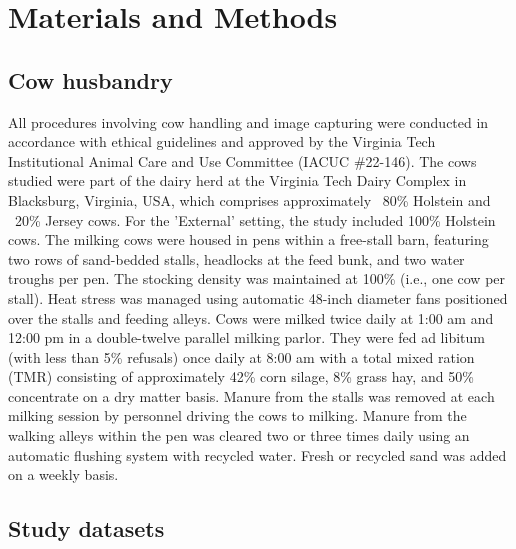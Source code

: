 \section{Materials and Methods}

\subsection*{Cow husbandry}

All procedures involving cow handling and image capturing were conducted in accordance with ethical guidelines and approved by the Virginia Tech Institutional Animal Care and Use Committee (IACUC \#22-146). The cows studied were part of the dairy herd at the Virginia Tech Dairy Complex in Blacksburg, Virginia, USA, which comprises approximately ~80\% Holstein and ~20\% Jersey cows. For the 'External' setting, the study included  100\% Holstein cows. The milking cows were housed in pens within a free-stall barn, featuring two rows of sand-bedded stalls, headlocks at the feed bunk, and two water troughs per pen. The stocking density was maintained at 100\% (i.e., one cow per stall). Heat stress was managed using automatic 48-inch diameter fans positioned over the stalls and feeding alleys. Cows were milked twice daily at 1:00 am and 12:00 pm in a double-twelve parallel milking parlor. They were fed ad libitum (with less than 5\% refusals) once daily at 8:00 am with a total mixed ration (TMR) consisting of approximately 42\% corn silage, 8\% grass hay, and 50\% concentrate on a dry matter basis. Manure from the stalls was removed at each milking session by personnel driving the cows to milking. Manure from the walking alleys within the pen was cleared two or three times daily using an automatic flushing system with recycled water. Fresh or recycled sand was added on a weekly basis.

\subsection*{Study datasets}

